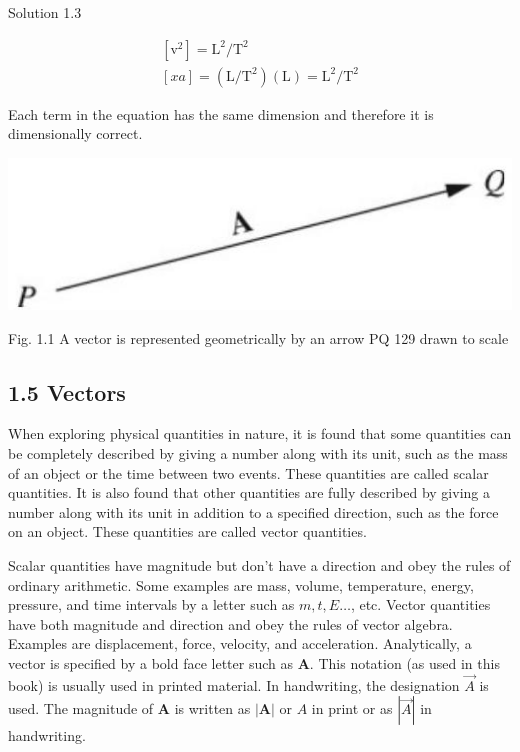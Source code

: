 \documentclass[10pt]{article}
\begin{document}
Solution 1.3

$$
\begin{gathered}
{\left[\mathrm{v}^{2}\right]=\mathrm{L}^{2} / \mathrm{T}^{2}} \\
{[x a]=\left(\mathrm{L} / \mathrm{T}^{2}\right)(\mathrm{L})=\mathrm{L}^{2} / \mathrm{T}^{2}}
\end{gathered}
$$

Each term in the equation has the same dimension and therefore it is dimensionally correct.

\begin{center}
\includegraphics[max width=\textwidth]{2024_09_13_db1f357d2aad0a03eb2eg-014}
\end{center}

Fig. 1.1 A vector is represented geometrically by an arrow PQ 129 drawn to scale

\subsection*{1.5 Vectors}
When exploring physical quantities in nature, it is found that some quantities can be completely described by giving a number along with its unit, such as the mass of an object or the time between two events. These quantities are called scalar quantities. It is also found that other quantities are fully described by giving a number along with its unit in addition to a specified direction, such as the force on an object. These quantities are called vector quantities.

Scalar quantities have magnitude but don't have a direction and obey the rules of ordinary arithmetic. Some examples are mass, volume, temperature, energy, pressure, and time intervals by a letter such as $m, t, E \ldots$, etc. Vector quantities have both magnitude and direction and obey the rules of vector algebra. Examples are displacement, force, velocity, and acceleration. Analytically, a vector is specified by a bold face letter such as $\mathbf{A}$. This notation (as used in this book) is usually used in printed material. In handwriting, the designation $\vec{A}$ is used. The magnitude of $\mathbf{A}$ is written as $|\mathbf{A}|$ or $A$ in print or as $|\vec{A}|$ in handwriting.
\end{document}
